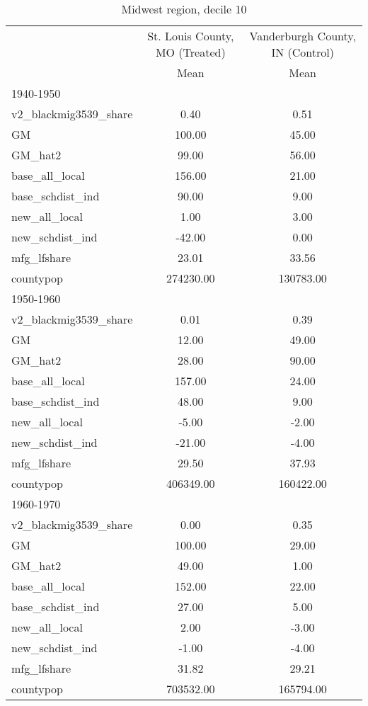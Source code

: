 \begin{table}[htbp]\centering
\def\sym#1{\ifmmode^{#1}\else\(^{#1}\)\fi}
\caption{Midwest region, decile 10 \label{tab1}}
\begin{tabular}{l*{2}{c}}
\toprule
                    &\multicolumn{1}{c}{St. Louis County, MO (Treated)}&\multicolumn{1}{c}{Vanderburgh County, IN (Control)}\\
                    &        Mean&        Mean\\
\midrule
1940-1950           &            &            \\
v2\_blackmig3539\_share&        0.40&        0.51\\
GM                  &      100.00&       45.00\\
GM\_hat2             &       99.00&       56.00\\
base\_all\_local      &      156.00&       21.00\\
base\_schdist\_ind    &       90.00&        9.00\\
new\_all\_local       &        1.00&        3.00\\
new\_schdist\_ind     &      -42.00&        0.00\\
mfg\_lfshare         &       23.01&       33.56\\
countypop           &   274230.00&   130783.00\\
\midrule
1950-1960           &            &            \\
v2\_blackmig3539\_share&        0.01&        0.39\\
GM                  &       12.00&       49.00\\
GM\_hat2             &       28.00&       90.00\\
base\_all\_local      &      157.00&       24.00\\
base\_schdist\_ind    &       48.00&        9.00\\
new\_all\_local       &       -5.00&       -2.00\\
new\_schdist\_ind     &      -21.00&       -4.00\\
mfg\_lfshare         &       29.50&       37.93\\
countypop           &   406349.00&   160422.00\\
\midrule
1960-1970           &            &            \\
v2\_blackmig3539\_share&        0.00&        0.35\\
GM                  &      100.00&       29.00\\
GM\_hat2             &       49.00&        1.00\\
base\_all\_local      &      152.00&       22.00\\
base\_schdist\_ind    &       27.00&        5.00\\
new\_all\_local       &        2.00&       -3.00\\
new\_schdist\_ind     &       -1.00&       -4.00\\
mfg\_lfshare         &       31.82&       29.21\\
countypop           &   703532.00&   165794.00\\
\bottomrule
\end{tabular}
\end{table}

